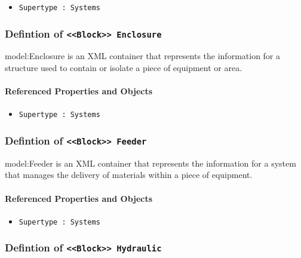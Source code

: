 \begin{itemize}
\item \texttt{Supertype : Systems}

\end{itemize}
\FloatBarrier
\subsubsection{Defintion of \texttt{<<Block>> Enclosure}}
  \label{type:Enclosure}

\FloatBarrier

{model:Enclosure} is an XML container that represents the information for a structure used to contain or isolate a piece of equipment or area.

\FloatBarrier
\paragraph{Referenced Properties and Objects}

\begin{itemize}
\item \texttt{Supertype : Systems}

\end{itemize}
\FloatBarrier
\subsubsection{Defintion of \texttt{<<Block>> Feeder}}
  \label{type:Feeder}

\FloatBarrier

{model:Feeder} is an XML container that represents the information for a system that manages the delivery of materials within a piece of equipment.

\FloatBarrier
\paragraph{Referenced Properties and Objects}

\begin{itemize}
\item \texttt{Supertype : Systems}

\end{itemize}
\FloatBarrier
\subsubsection{Defintion of \texttt{<<Block>> Hydraulic}}
  \label{type:Hydraulic}

\FloatBarrier

